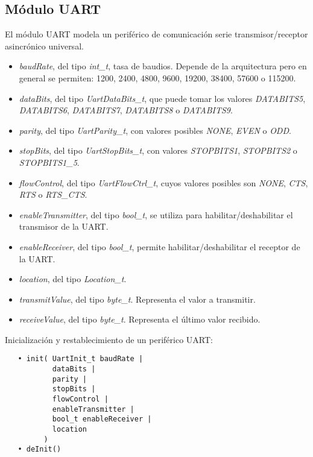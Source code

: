 \subsection{Módulo UART}

El módulo UART modela un periférico de comunicación serie transmisor/receptor asincrónico universal.


\begin{itemize}
\item
\emph{baudRate}, del tipo \emph{int\_t}, tasa de baudios. Depende de la arquitectura pero en general se permiten: 1200, 2400, 4800, 9600, 19200, 38400, 57600 o 115200.
\item
\emph{dataBits}, del tipo \emph{UartDataBits\_t}, que puede tomar los valores \emph{DATABITS5}, \emph{DATABITS6}, \emph{DATABITS7}, \emph{DATABITS8} o \emph{DATABITS9}.
\item
\emph{parity}, del tipo \emph{UartParity\_t}, con valores posibles \emph{NONE}, \emph{EVEN} o \emph{ODD}.
\item
\emph{stopBits}, del tipo \emph{UartStopBits\_t}, con valores \emph{STOPBITS1}, \emph{STOPBITS2} o \emph{STOPBITS1\_5}.
\item
\emph{flowControl}, del tipo \emph{UartFlowCtrl\_t}, cuyos valores posibles son \emph{NONE}, \emph{CTS}, \emph{RTS} o \emph{RTS\_CTS}.
\item
\emph{enableTransmitter}, del tipo \emph{bool\_t}, se utiliza para habilitar/deshabilitar el transmisor de la UART.
\item
\emph{enableReceiver}, del tipo \emph{bool\_t}, permite habilitar/deshabilitar el receptor de la UART.
\item
\emph{location}, del tipo \emph{Location\_t}.
\item
\emph{transmitValue}, del tipo \emph{byte\_t}. Representa el valor a transmitir.
\item
\emph{receiveValue}, del tipo \emph{byte\_t}. Representa el último valor recibido. 
\end{itemize}


Inicialización y restablecimiento de un periférico UART:

\begin{verbatim}
   • init( UartInit_t baudRate | 
           dataBits | 
           parity | 
           stopBits | 
           flowControl |
           enableTransmitter | 
           bool_t enableReceiver |
           location
         )
   • deInit()
\end{verbatim}

